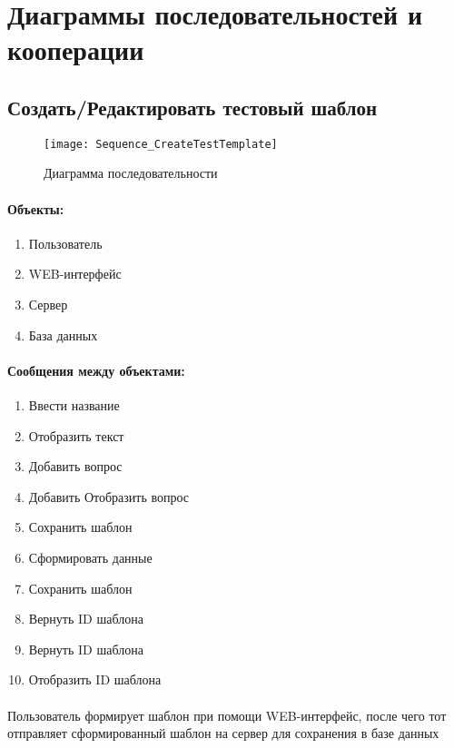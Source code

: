 \documentclass{article}
\begin{document}
    \section{Диаграммы последовательностей и кооперации}
    

    \subsection{Создать/Редактировать тестовый шаблон}   
        \begin{figure}[H]
            \texttt{[image: Sequence\_CreateTestTemplate]}
            \caption{Диаграмма последовательности}
        \end{figure}
        
        \paragraph{Объекты:}
        \begin{enumerate}
            \item Пользователь
            \item WEB-интерфейс
            \item Сервер
            \item База данных
        \end{enumerate}
        
        \paragraph{Сообщения между объектами:}
        \begin{enumerate}
            \item Ввести название
            \item Отобразить текст
            \item Добавить вопрос
            \item Добавить Отобразить вопрос
            \item Сохранить шаблон
            \item Сформировать данные
            \item Сохранить шаблон
            \item Вернуть ID шаблона
            \item Вернуть ID шаблона
            \item Отобразить ID шаблона
        \end{enumerate}
        \paragraph{}
        Пользователь формирует шаблон при помощи WEB-интерфейс, после чего тот
        отправляет сформированный шаблон на сервер для сохранения в базе данных
\end{document}
